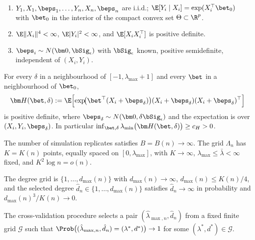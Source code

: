 \begin{assumption}\label{app:ass:model}
\leavevmode
\begin{enumerate}\itemsep2pt
\item[(a)] $Y_1,X_1,\beps_1,\dots,Y_n,X_n,\beps_n$ are i.i.d.;
      $\E[Y_i\mid X_i]=\exp(X_i^\top\bet_0)$ with $\bet_0$ in the interior
      of the compact convex set $\Theta\subset\R^p$.
\item[(b)] $\E\|X_i\|^4<\infty$, $\E|Y_i|^2<\infty$, and
      $\E[X_iX_i^\top]$ is positive definite.
\item[(c)] $\beps_i\sim N(\bm 0,\bSig_\epsilon)$ with $\bSig_\epsilon$
      known, positive semidefinite, independent of $(X_i,Y_i)$.
\end{enumerate}
\end{assumption}

\begin{assumption}\label{app:ass:pseudo}
For every $\delta$ in a neighbourhood of $[-1,\lambda_{\max}+1]$ and every
$\bet$ in a neighbourhood of $\bet_0$,
\[
  \bm H(\bet,\delta)
  := \E\Bigl[\exp\!\bigl(\bet^\top(X_i+\beps_\delta)\bigr)
      (X_i+\beps_\delta)(X_i+\beps_\delta)^\top\Bigr]
\]
is positive definite, where $\beps_\delta\sim N(\bm 0,\delta\bSig_\epsilon)$
and the expectation is over $(X_i,Y_i,\beps_\delta)$. In particular
$\inf_{\bet,\delta}\lambda_{\min}\bigl(\bm H(\bet,\delta)\bigr)\ge c_H>0$.
\end{assumption}

\begin{assumption}\label{app:ass:simgrid}
The number of simulation replicates satisfies $B=B(n)\to\infty$. The grid
$\Lambda_n$ has $K=K(n)$ points, equally spaced on $[0,\lambda_{\max}]$,
with $K\to\infty$, $\lambda_{\max}\le\bar\lambda<\infty$ fixed, and
$K^2\log n=o(n)$.
\end{assumption}

\begin{assumption}\label{app:ass:degree}
The degree grid is $\{1,\dots,d_{\max}(n)\}$ with $d_{\max}(n)\to\infty$,
$d_{\max}(n)\le K(n)/4$, and the selected degree
$\hat d_n\in\{1,\dots,d_{\max}(n)\}$ satisfies
$\hat d_n\to\infty$ in probability and
$d_{\max}(n)^3/K(n)\to 0$.
\end{assumption}

\begin{assumption}\label{app:ass:cv}
The cross-validation procedure selects a pair
$(\hat\lambda_{\max,n},\hat d_n)$ from a fixed finite grid
$\mathcal G$ such that
$\Prob\bigl((\hat\lambda_{\max,n},\hat d_n)=(\lambda^*,d^*)\bigr)\to 1$
for some $(\lambda^*,d^*)\in\mathcal G$.
\end{assumption}

